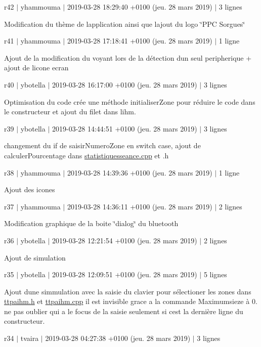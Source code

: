 r42 $\vert$ yhammouma $\vert$ 2019-\/03-\/28 18\+:29\+:40 +0100 (jeu. 28 mars 2019) $\vert$ 3 lignes

Modification du thème de l\textquotesingle{}application ainsi que l\textquotesingle{}ajout du logo \char`\"{}\+P\+P\+C
\+Sorgues\char`\"{}

r41 $\vert$ yhammouma $\vert$ 2019-\/03-\/28 17\+:18\+:41 +0100 (jeu. 28 mars 2019) $\vert$ 1 ligne

Ajout de la modification du voyant lors de la détection d\textquotesingle{}un seul peripherique + ajout de l\textquotesingle{}icone ecran

r40 $\vert$ ybotella $\vert$ 2019-\/03-\/28 16\+:17\+:00 +0100 (jeu. 28 mars 2019) $\vert$ 3 lignes

Optimisation du code crée une méthode initialiser\+Zone pour réduire le code dans le constructeur et ajout du filet dans l\textquotesingle{}ihm.

r39 $\vert$ ybotella $\vert$ 2019-\/03-\/28 14\+:44\+:51 +0100 (jeu. 28 mars 2019) $\vert$ 3 lignes

changement du if de saisir\+Numero\+Zone en switch case, ajout de calculer\+Pourcentage dans \hyperlink{statistiquesseance_8cpp}{statistiquesseance.\+cpp} et .h

r38 $\vert$ yhammouma $\vert$ 2019-\/03-\/28 14\+:39\+:36 +0100 (jeu. 28 mars 2019) $\vert$ 1 ligne

Ajout des icones

r37 $\vert$ yhammouma $\vert$ 2019-\/03-\/28 14\+:36\+:11 +0100 (jeu. 28 mars 2019) $\vert$ 2 lignes

Modification graphique de la boite \char`\"{}dialog\char`\"{} du bluetooth

r36 $\vert$ ybotella $\vert$ 2019-\/03-\/28 12\+:21\+:54 +0100 (jeu. 28 mars 2019) $\vert$ 2 lignes

Ajout de simulation

r35 $\vert$ ybotella $\vert$ 2019-\/03-\/28 12\+:09\+:51 +0100 (jeu. 28 mars 2019) $\vert$ 5 lignes

Ajout d\textquotesingle{}une simmulation avec la saisie du clavier pour sélectioner les zones dans \hyperlink{ttpaihm_8h}{ttpaihm.\+h} et \hyperlink{ttpaihm_8cpp}{ttpaihm.\+cpp} il est invisible grace a la commande Maximumsieze à 0. ne pas oublier qui a le focus de la saisie seulement si c\textquotesingle{}est la dernière ligne du constructeur.

r34 $\vert$ tvaira $\vert$ 2019-\/03-\/28 04\+:27\+:38 +0100 (jeu. 28 mars 2019) $\vert$ 3 lignes

